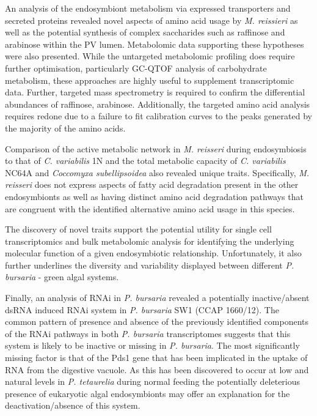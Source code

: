 An analysis of the endosymbiont metabolism via expressed 
transporters and secreted proteins revealed novel
aspects of amino acid usage by \textit{M. reissieri}
as well as the potential synthesis of complex saccharides
such as raffinose and arabinose within the PV lumen. 
Metabolomic data supporting these hypotheses
were also presented.  While the untargeted metabolomic profiling
does require further optimisation, particularly GC-QTOF analysis
of carbohydrate metabolism, these approaches are highly
useful to supplement transcriptomic data.
Further, targeted mass spectrometry is required to confirm
the differential abundances of raffinose, arabinose.
Additionally, the targeted amino acid analysis requires
redone due to a failure to fit calibration curves to the peaks
generated by the majority of the amino acids. 

Comparison of the active metabolic network in \textit{M. reisseri}
during endosymbiosis to that of \textit{C. variabilis} 1N 
and the total metabolic capacity of \textit{C. variabilis} NC64A
and \textit{Coccomyxa subellipsoidea} also revealed 
unique traits.  Specifically, \textit{M. reisseri} does not express
aspects of fatty acid degradation present in the other endosymbionts
as well as having distinct amino acid degradation pathways that are
congruent with the identified alternative amino acid usage in this species. 

The discovery of novel traits support the potential
 utility for single cell transcriptomics and bulk metabolomic
 analysis for identifying the underlying molecular function
 of a given endosymbiotic relationship.
 Unfortunately, it also further underlines the diversity
 and variability displayed between different \textit{P. bursaria}
 - green algal systems.  


 Finally, an analysis of RNAi in \textit{P. bursaria}
 revealed a potentially inactive/absent dsRNA induced RNAi system
 in \textit{P. bursaria} SW1 (CCAP 1660/12).  
 The common pattern of presence and absence of the
 previously identified components of the 
 RNAi pathways in both \textit{P. bursaria} transcriptomes
suggests that this system is likely to be inactive or missing in 
\textit{P. bursaria}. The most significantly missing factor is that
of the Pds1 gene that has been implicated in the uptake of RNA
from the digestive vacuole. As this has been discovered to occur
at low and natural levels in \textit{P. tetaurelia} during normal
feeding \citep{Carradec2015} the potentially deleterious 
presence of eukaryotic algal endosymbionts
may offer an explanation for the deactivation/absence of this system.

